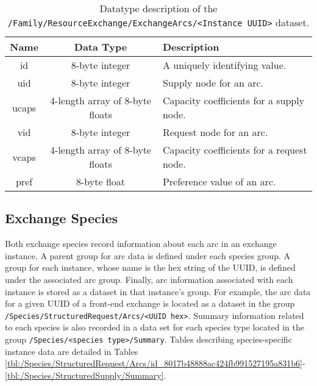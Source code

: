 \begin{table}[h!]
\centering
\caption{
\label{tbl:/Family/ResourceExchange/ExchangeArcs}
Datatype description of the \lstinline[basicstyle=\ttfamily\color{black}]|/Family/ResourceExchange/ExchangeArcs/<Instance UUID>| dataset.}
\begin{tabularx}{\columnwidth-10pt}{|c|c|X|} %
\hline
\textbf{Name} & \textbf{Data Type} & \textbf{Description}       \\ \hline
id & 8-byte integer & A uniquely identifying value. \\ \hline
uid & 8-byte integer & Supply node for an arc. \\ \hline
ucaps & 4-length array of 8-byte floats & Capacity coefficients for a supply node. \\ \hline
vid & 8-byte integer & Request node for an arc. \\ \hline
vcaps & 4-length array of 8-byte floats & Capacity coefficients for a request node. \\ \hline
pref & 8-byte float & Preference value of an arc. \\ \hline
\end{tabularx}
\end{table}

\subsection{Exchange Species}

Both exchange species record information about each arc in an exchange
instance. A parent group for arc data is defined under each species group. A
group for each instance, whose name is the hex string of the UUID, is defined
under the associated arc group. Finally, arc information associated with each
instance is stored as a dataset in that instance's group. For example, the arc
data for a given UUID of a front-end exchange is located as a dataset in the
group \texttt{/Species/StructuredRequest/Arcs/<UUID hex>}. Summary information
related to each species is also recorded in a data set for each species type
located in the group \texttt{/Species/<species type>/Summary}. Tables describing
species-specific instance data are detailed in Tables
\ref{tbl:/Species/StructuredRequest/Arcs/id_8017b48888ac424fb991527195a831b6}-\ref{tbl:/Species/StructuredSupply/Summary}.

